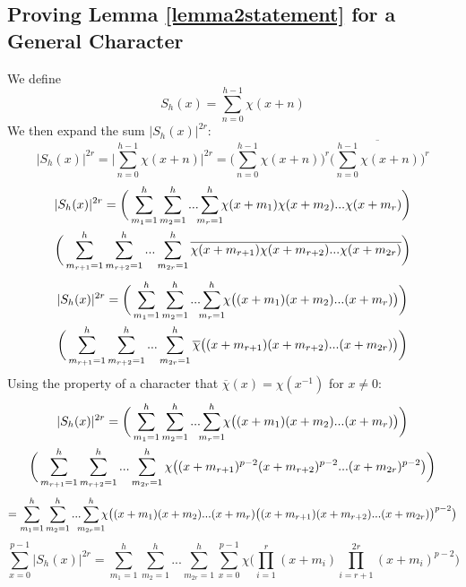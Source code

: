 \documentclass{report}
\begin{document}
\subsection{Proving Lemma \ref{lemma2statement} for a General Character}
We define
\begin{equation} \label{definesh}
S_h(x)=\sum\limits_{n=0}^{h-1}\chi(x+n)
\end{equation}
We then expand the sum $\lvert S_h(x)\rvert^{2r}$:
$$\lvert S_h(x)\rvert^{2r}= \Big\lvert\sum\limits_{n=0}^{h-1}\chi(x+n)\Big\rvert^{2r}= \Big(\sum\limits_{n=0}^{h-1}\chi(x+n)\Big)^r\Big(\overline{\sum\limits_{n=0}^{h-1}\chi(x+n)}\Big)^r$$
\begin{multline*}
\lvert S_h(x)\rvert^{2r} =\bigg(\sum\limits_{m_1=1}^h\sum\limits_{m_2=1}^h...\sum\limits_{\mathclap{m_{r}=1}}^h \chi(x+m_1)\chi(x+m_2)...\chi(x+m_{r})\bigg)
\\
\bigg(\sum\limits_{m_{r+1}=1}^h\sum\limits_{m_{r+2}=1}^h...\sum\limits_{m_{2r}=1}^h \overline{\chi(x+m_{r+1})\chi(x+m_{r+2})...\chi(x+m_{2r})}\bigg)
\end{multline*}
\begin{multline*}
\lvert S_h(x)\rvert^{2r} =\bigg(\sum\limits_{m_1=1}^h\sum\limits_{m_2=1}^h...\sum\limits_{\mathclap{m_{r}=1}}^h \chi\big((x+m_1)(x+m_2)...(x+m_{r})\big)\bigg)
\\
\bigg(\sum\limits_{m_{r+1}=1}^h\sum\limits_{m_{r+2}=1}^h...\sum\limits_{m_{2r}=1}^h \overline{\chi}\big((x+m_{r+1})(x+m_{r+2})...(x+m_{2r})\big)\bigg)
\end{multline*}
Using the property of a character that $\overline{\chi}(x)=\chi (x^{-1})$ for $x\neq0$:
\begin{multline*}
\lvert S_h(x)\rvert^{2r} =\bigg(\sum\limits_{m_1=1}^h\sum\limits_{m_2=1}^h...\sum\limits_{\mathclap{m_{r}=1}}^h \chi\big((x+m_1)(x+m_2)...(x+m_{r})\big)\bigg)
\\
\bigg(\sum\limits_{m_{r+1}=1}^h\sum\limits_{m_{r+2}=1}^h...\sum\limits_{m_{2r}=1}^h \chi\big((x+m_{r+1})^{p-2}(x+m_{r+2})^{p-2}...(x+m_{2r})^{p-2}\big)\bigg)
\end{multline*}
$$=\sum\limits_{m_1=1}^h\sum\limits_{m_2=1}^h...\sum\limits_{\mathclap{m_{2r}=1}}^h \chi\big((x+m_1)(x+m_2)...(x+m_{r})\big((x+m_{r+1})(x+m_{r+2})...(x+m_{2r})\big)^{p-2}\big)$$
\begin{equation} \label{generaltuple}
\sum_{x=0}^{p-1}\lvert S_h(x)\rvert^{2r}= \sum\limits_{m_1=1}^h\sum\limits_{m_2=1}^h...\sum\limits_{m_{2r}=1}^h
\sum_{x=0}^{p-1}\chi\Big(\prod_{i=1}^r(x+m_i)\prod_{i=r+1}^{2r}(x+m_{i})^{p-2}\Big)
\end{equation}
\end{document}
